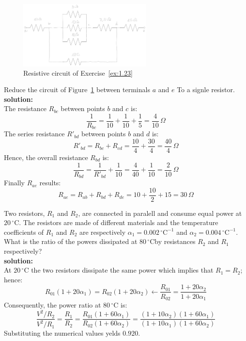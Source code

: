 \begin{figure}[h!]
  \centering
  \includegraphics[width=0.6\textwidth]{"images/Fig-03"}
  \caption{Resistive circuit of Exercise~\ref{ex:1.23}} 
  \label{Fig:Ex:1.23}
\end{figure}

\begin{exercise}
\label{ex:1.23}
Reduce the circuit of Figure~\ref{Fig:Ex:1.23} between terminals $a$ and $e$ To a signle resistor.\\

\textbf{solution:}\\
The resistance $R_{bc}$ between points $b$ and $c$ is:
\[\frac{1}{R_{bc}} = \frac{1}{10} + \frac{1}{10} + \frac{1}{5} = \frac{4}{10}\,\Omega\]
The series resistance $R'_{bd}$ between points $b$ and $d$ is:
\[R'_{bd} = R_{bc} + R_{cd} = \frac{10}{4} + \frac{30}{4} =\frac{40}{4}\,\Omega\]
Hence, the overall resistance $R_{bd}$ is:
\[\frac{1}{R_{bd}} = \frac{1}{R'_{bd}} + \frac{1}{10} = \frac{4}{40} + \frac{1}{10} = \frac{2}{10}\,\Omega\]
Finally $R_{ae}$ results:
\[R_{ae} = R_{ab} + R_{bd} + R_{de} = 10 + \frac{10}{2} + 15 = 30\,\Omega\]
\end{exercise}

\begin{exercise}
Two resistors, $R_1$ and $R_2$, are connected in paralell and consume equal power at $20\,^{\circ}\textrm{C}$. The resistors are made of different materials and the temperature coefficients of $R_1$ and $R_2$ are respectively $\alpha_1 = 0.002\,^{\circ}\textrm{C}^{-1}$ and $\alpha_2 = 0.004\,^{\circ}\textrm{C}^{-1}$. What is the ratio of the powers dissipated at $80\,^{\circ}\textrm{C}$by resistances $R_2$ and $R_1$ respectively?\\

\textbf{solution:}\\
At $20\,^{\circ}\textrm{C}$ the two resistors dissipate the same power which implies that $R_1=R_2$; hence:
\[R_{01}(1+20\alpha_1) = R_{02}(1+20\alpha_2) \longleftarrow \frac{R_{01}}{R_{02}} = \frac{1+20\alpha_2}{1+20\alpha_1}\] 
Consequently, the power ratio at $80\,^{\circ}\textrm{C}$ is:
\[\frac{V^2/R_2}{V^2/R_1} = \frac{R_1}{R_2} = \frac{R_{01}(1+60\alpha_1)}{R_{02}(1+60\alpha_2)} = \frac{(1+10\alpha_2)(1+60\alpha_1)}{(1+10\alpha_1)(1+60\alpha_2)}\]
Substituting the numerical values yelds $0.920$.
\end{exercise}

